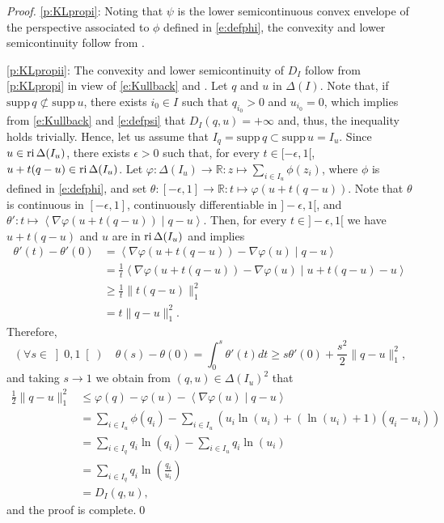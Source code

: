 \documentclass[smallextended,referee,envcountsect,]{svjour3}
\newcommand{\reli}{\ensuremath{\text{\rm ri}\,}}
\newcommand{\R}{{\mathbb R}}
\newcommand{\scal}[2]{{\left\langle{{#1}\mid{#2}}\right\rangle}}
\newcommand{\supp}{\mathrm{supp}\,}
\begin{document}
\begin{proof}
\ref{p:KLpropi}: 
Noting that $\psi$ is the {lower semicontinuous convex 
envelope of 
the perspective 
associated to $\phi$ defined in \eqref{e:defphi},
the convexity and lower semicontinuity follow from 
\cite[Proposition~9.42]{BauschkeCombettes17}. }


\ref{p:KLpropii}: The convexity and lower semicontinuity of $D_I$
follow from \ref{p:KLpropi} in view of \eqref{e:Kullback} and 
\cite[Proposition~8.6]{BauschkeCombettes17}. Let $q$ and $u$ in 
$\Delta(I)$.
Note that, if $\supp q\not\subset \supp u$, there exists $i_0\in I$
such that $q_{i_0}>0$ and $u_{i_0}=0$, which implies from 
\eqref{e:Kullback} and \eqref{e:defpsi} that $D_I(q,u)=+\infty$ and, 
thus, the inequality holds trivially. Hence, let us assume that 
$I_q=\supp 
q\subset \supp u=I_u$.
Since $u\in\reli\Delta(I_u)$, there exists $\epsilon>0$
such that, for every $t\in [-\epsilon,1[$, 
$u+t(q-u)\in\reli\Delta(I_u)$.
Let $\varphi\colon\Delta(I_u)\to\R\colon z\mapsto 
\sum_{i\in I_u}\phi(z_i)$, where $\phi$ is defined in 
\eqref{e:defphi}, 
and set
$\theta\colon[-\epsilon,1]\to\R\colon t\mapsto 
\varphi(u+t(q-u))$. 
Note that 
$\theta$ is continuous in $[-\epsilon,1]$, continuously differentiable 
in 
$]-\epsilon,1[$,
and $\theta'\colon t\mapsto \scal{\nabla\varphi(u+t(q-u))}{q-u}$.
Then, for every $t\in]-\epsilon,1[$ we have $u+t(q-u)$ and $u$ are 
in 
$\reli\Delta(I_u)$ and \cite[Proposition~5.1(a)]{BeckTeb03} 
implies
\begin{align}
\theta'(t)-\theta'(0)&=\scal{\nabla\varphi(u+t(q-u))
-\nabla\varphi(u)}{q-u}\nonumber\\
&=
\frac{1}{t}\scal{\nabla\varphi(u+t(q-u))-\nabla\varphi(u)}{u+t(q-u)-u}
\nonumber\\
&\ge 
\frac{1}{t}\|t(q-u)\|_1^2\nonumber\\
&=t\|q-u\|_1^2.
\end{align}
Therefore,
\begin{equation}
(\forall s\in\left]0,1\right[)\quad 
\theta(s)-\theta(0)=\int_0^s\theta'(t)dt\ge 
s\theta'(0)+\frac{s^2}{2}\|q-u\|_1^2,
\end{equation}
and taking $s\to 1$ we obtain from $(q,u)\in\Delta(I_u)^2$ that
\begin{align}
\frac{1}{2}\|q-u\|_1^2&\le 
\varphi(q)-\varphi(u)-\scal{\nabla\varphi(u)}{q-u}\nonumber\\ 
&=\sum_{i\in I_u}\phi(q_i)-\sum_{i\in 
I_u}(u_i\ln(u_i)+(\ln(u_i)+1)(q_i-u_i))
\nonumber\\
&=\sum_{i\in I_q}q_i\ln(q_i)-\sum_{i\in I_u}q_i\ln(u_i)\nonumber\\
&=\sum_{i\in I_q}q_i\ln\left(\frac{q_i}{u_i}\right)\nonumber\\
&=D_I(q,u),
\end{align}
and the proof is complete.\qed
\end{proof}
\end{document}
